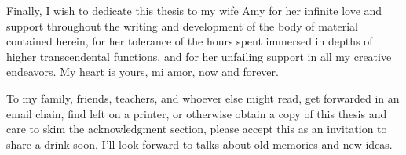 Finally, I wish to dedicate this thesis to my wife Amy for her infinite love and support throughout the writing and development of the body of material contained herein, for her tolerance of the hours spent immersed in depths of higher transcendental functions, and for her unfailing support in all my creative endeavors.  My heart is yours, mi amor, now and forever.

To my family, friends, teachers, and whoever else might read, get forwarded in an email chain, find left on a printer, or otherwise obtain a copy of this thesis and care to skim the acknowledgment section, please accept this as an invitation to share a drink soon. I'll look forward to talks about old memories and new ideas.